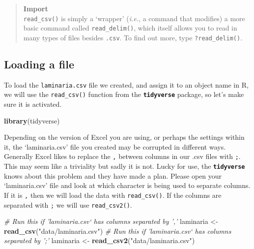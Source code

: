 \documentclass[]{book}
\newenvironment{Shaded}{\begin{snugshade}}{\end{snugshade}}
\newcommand{\KeywordTok}[1]{\textcolor[rgb]{0.13,0.29,0.53}{\textbf{#1}}}
\newcommand{\StringTok}[1]{\textcolor[rgb]{0.31,0.60,0.02}{#1}}
\newcommand{\CommentTok}[1]{\textcolor[rgb]{0.56,0.35,0.01}{\textit{#1}}}
\newcommand{\NormalTok}[1]{#1}
\theoremstyle{definition}
\theoremstyle{definition}
\theoremstyle{definition}
\theoremstyle{remark}
\begin{document}
\begin{quote}
\textbf{Import}\\
\texttt{read\_csv()} is simply a `wrapper' (\emph{i.e.}, a command that
modifies) a more basic command called \texttt{read\_delim()}, which
itself allows you to read in many types of files besides \texttt{.csv}.
To find out more, type \texttt{?read\_delim()}.
\end{quote}

\subsection{Loading a file}\label{loading-a-file}

To load the \texttt{laminaria.csv} file we created, and assign it to an
object name in R, we will use the \texttt{read\_csv()} function from the
\textbf{\texttt{tidyverse}} package, so let's make sure it is activated.

\begin{Shaded}
\begin{Highlighting}[]
\KeywordTok{library}\NormalTok{(tidyverse)}
\end{Highlighting}
\end{Shaded}

Depending on the version of Excel you are using, or perhaps the settings
within it, the `laminaria.csv' file you created may be corrupted in
different ways. Generally Excel likes to replace the \texttt{,} between
columns in our .csv files with \texttt{;}. This may seem like a
triviality but sadly it is not. Lucky for use, the
\textbf{\texttt{tidyverse}} knows about this problem and they have made
a plan. Please open your `laminaria.csv' file and look at which
character is being used to separate columns. If it is \texttt{,} then we
will load the data with \texttt{read\_csv()}. If the columns are
separated with \texttt{;} we will use \texttt{read\_csv2()}.

\begin{Shaded}
\begin{Highlighting}[]
\CommentTok{# Run this if 'laminaria.csv` has columns separated by ','}
\NormalTok{laminaria <-}\StringTok{ }\KeywordTok{read_csv}\NormalTok{(}\StringTok{"data/laminaria.csv"}\NormalTok{)}
\CommentTok{# Run this if 'laminaria.csv` has columns separated by ';'}
\NormalTok{laminaria <-}\StringTok{ }\KeywordTok{read_csv2}\NormalTok{(}\StringTok{"data/laminaria.csv"}\NormalTok{)}
\end{Highlighting}
\end{Shaded}
\end{document}
